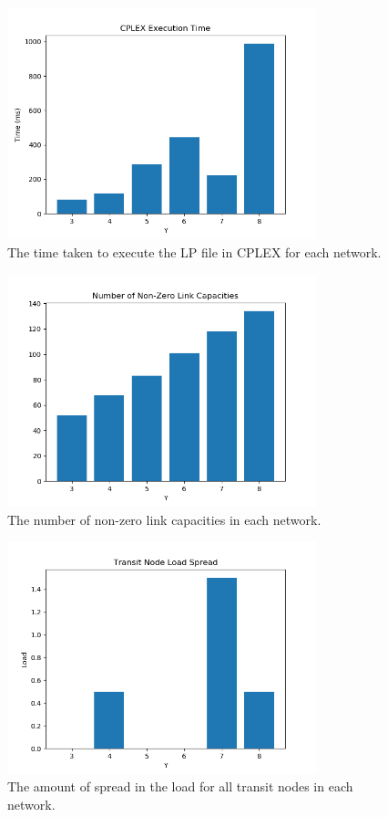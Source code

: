 \documentclass[12pt]{article} %
\begin{document}
\begin{figure}[H]
	\centering
	\includegraphics[width=0.8\textwidth]{cplex_data_time}
	\caption{The time taken to execute the LP file in CPLEX for each network.}
	\label{fig:cplex_time}
\end{figure}

\begin{figure}[H]
	\centering
	\includegraphics[width=0.8\textwidth]{cplex_data_num_nonzero_links}
	\caption{The number of non-zero link capacities in each network.}
	\label{fig:cplex_num_nonzero_links}
\end{figure}

\begin{figure}[H]
	\centering
	\includegraphics[width=0.8\textwidth]{cplex_data_transit_load_spread}
	\caption{The amount of spread in the load for all transit nodes in each network.}
	\label{fig:cplex_transit_load_spread}
\end{figure}
\end{document}
